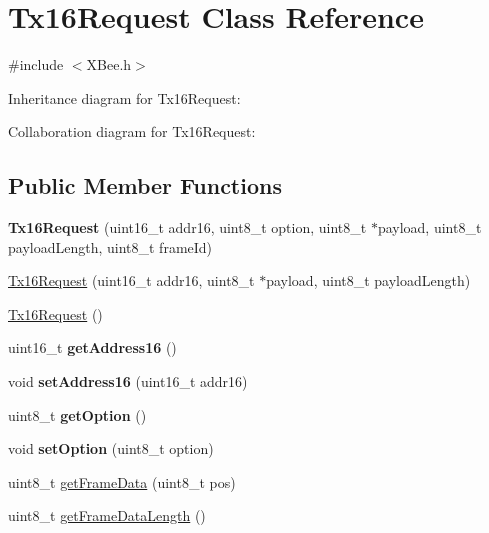 \hypertarget{class_tx16_request}{}\section{Tx16\+Request Class Reference}
\label{class_tx16_request}


{\ttfamily \#include $<$X\+Bee.\+h$>$}



Inheritance diagram for Tx16\+Request\+:


Collaboration diagram for Tx16\+Request\+:
\subsection*{Public Member Functions}
\begin{DoxyCompactItemize}
\item 
\hypertarget{class_tx16_request_a4e8f8b660e4837f4053e9f18d394f913}{}\label{class_tx16_request_a4e8f8b660e4837f4053e9f18d394f913} 
{\bfseries Tx16\+Request} (uint16\+\_\+t addr16, uint8\+\_\+t option, uint8\+\_\+t $\ast$payload, uint8\+\_\+t payload\+Length, uint8\+\_\+t frame\+Id)
\item 
\hyperlink{class_tx16_request_a760e2c31996673e816fb3576748f731f}{Tx16\+Request} (uint16\+\_\+t addr16, uint8\+\_\+t $\ast$payload, uint8\+\_\+t payload\+Length)
\item 
\hyperlink{class_tx16_request_adcdbb644e08788267fb86cbefde76b1b}{Tx16\+Request} ()
\item 
\hypertarget{class_tx16_request_adeb9cf2989e2c86992f6a652a92bd648}{}\label{class_tx16_request_adeb9cf2989e2c86992f6a652a92bd648} 
uint16\+\_\+t {\bfseries get\+Address16} ()
\item 
\hypertarget{class_tx16_request_ac28c597252a64d47df3bb61dd8251ee4}{}\label{class_tx16_request_ac28c597252a64d47df3bb61dd8251ee4} 
void {\bfseries set\+Address16} (uint16\+\_\+t addr16)
\item 
\hypertarget{class_tx16_request_a448d4a28812d6cc67a7c45138ba6061c}{}\label{class_tx16_request_a448d4a28812d6cc67a7c45138ba6061c} 
uint8\+\_\+t {\bfseries get\+Option} ()
\item 
\hypertarget{class_tx16_request_afc0792e586ddb3c9d62efb787a5956d9}{}\label{class_tx16_request_afc0792e586ddb3c9d62efb787a5956d9} 
void {\bfseries set\+Option} (uint8\+\_\+t option)
\item 
uint8\+\_\+t \hyperlink{class_tx16_request_af5ffbc2164e766d96f54c723996fd389}{get\+Frame\+Data} (uint8\+\_\+t pos)
\item 
uint8\+\_\+t \hyperlink{class_tx16_request_a9a1ddfb380e72ecc09a024c6de6cdf8e}{get\+Frame\+Data\+Length} ()
\end{DoxyCompactItemize}
